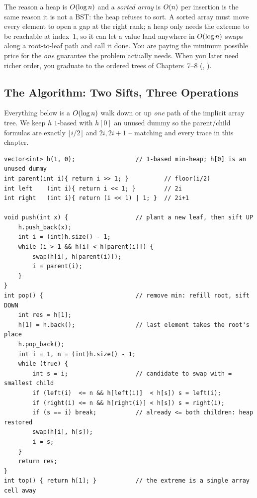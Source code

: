 \begin{insightbox}
The reason a heap is $O(\log n)$ and a \emph{sorted array} is $O(n)$ per insertion is the same
reason it is not a BST: the heap refuses to sort. A sorted array must move every element to open a gap at
the right rank; a heap only needs the extreme to be reachable at index~$1$, so it can let a value land
anywhere in $O(\log n)$ swaps along a root-to-leaf path and call it done. You are paying the minimum
possible price for the \emph{one} guarantee the problem actually needs. When you later need richer order,
you graduate to the ordered trees of Chapters~7--8 (, ).
\end{insightbox}

\subsection{The Algorithm: Two Sifts, Three Operations}

Everything below is a $O(\log n)$ walk down or up \emph{one} path of the implicit array tree. We keep
$h$ $1$-based with $h[0]$ an unused dummy so the parent/child formulas are exactly $\lfloor i/2\rfloor$ and
$2i,2i+1$ -- matching  and every trace in this chapter.

\begin{lstlisting}[caption={A hand-written min-heap: \code{push}, \code{pop}, \code{top} on an implicit array}, label={lst:c07-heapops}]
vector<int> h(1, 0);                 // 1-based min-heap; h[0] is an unused dummy
int parent(int i){ return i >> 1; }          // floor(i/2)
int left    (int i){ return i << 1; }        // 2i
int right   (int i){ return (i << 1) | 1; }  // 2i+1

void push(int x) {                   // plant a new leaf, then sift UP
    h.push_back(x);
    int i = (int)h.size() - 1;
    while (i > 1 && h[i] < h[parent(i)]) {
        swap(h[i], h[parent(i)]);
        i = parent(i);
    }
}
int pop() {                          // remove min: refill root, sift DOWN
    int res = h[1];
    h[1] = h.back();                 // last element takes the root's place
    h.pop_back();
    int i = 1, n = (int)h.size() - 1;
    while (true) {
        int s = i;                   // candidate to swap with = smallest child
        if (left(i)  <= n && h[left(i)]  < h[s]) s = left(i);
        if (right(i) <= n && h[right(i)] < h[s]) s = right(i);
        if (s == i) break;           // already <= both children: heap restored
        swap(h[i], h[s]);
        i = s;
    }
    return res;
}
int top() { return h[1]; }           // the extreme is a single array cell away
\end{lstlisting}

